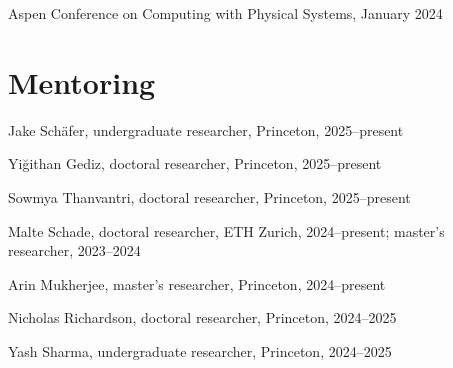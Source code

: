 \documentclass[11pt]{article}
\begin{document}
Aspen Conference on Computing with Physical Systems, January 2024

\section*{Mentoring}
Jake Schäfer, undergraduate researcher, Princeton, 2025--present

Yiğithan Gediz, doctoral researcher, Princeton, 2025--present

Sowmya Thanvantri, doctoral researcher, Princeton, 2025--present

Malte Schade, doctoral researcher, ETH Zurich, 2024--present; master's researcher, 2023--2024

Arin Mukherjee, master's researcher, Princeton, 2024--present

Nicholas Richardson, doctoral researcher, Princeton, 2024--2025

Yash Sharma, undergraduate researcher, Princeton, 2024--2025
\end{document}
